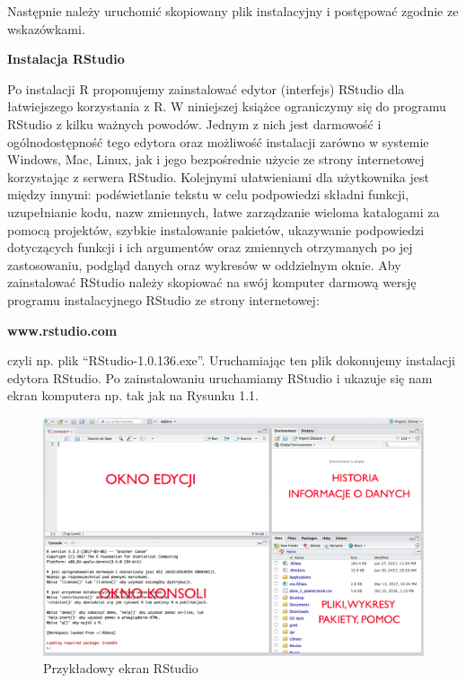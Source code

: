 \documentclass[12pt,B5paper,]{book}
\begin{document}
Następnie należy uruchomić skopiowany plik instalacyjny i postępować
zgodnie ze wskazówkami.

\textbf{Instalacja RStudio}

Po instalacji R proponujemy zainstalować edytor (interfejs) RStudio
\citep{RStudio} dla łatwiejszego korzystania z R. W niniejszej książce
ograniczymy się do programu RStudio z kilku ważnych powodów. Jednym z
nich jest darmowość i ogólnodostępność tego edytora oraz możliwość
instalacji zarówno w systemie Windows, Mac, Linux, jak i jego
bezpośrednie użycie ze strony internetowej korzystając z serwera
RStudio. Kolejnymi ułatwieniami dla użytkownika jest między innymi:
podświetlanie tekstu w celu podpowiedzi składni funkcji, uzupełnianie
kodu, nazw zmiennych, łatwe zarządzanie wieloma katalogami za pomocą
projektów, szybkie instalowanie pakietów, ukazywanie podpowiedzi
dotyczących funkcji i ich argumentów oraz zmiennych otrzymanych po jej
zastosowaniu, podgląd danych oraz wykresów w oddzielnym oknie. Aby
zainstalować RStudio należy skopiować na swój komputer darmową wersję
programu instalacyjnego RStudio ze strony internetowej:

\begin{center}
{\bf www.rstudio.com }
\end{center}

czyli np. plik ``RStudio-1.0.136.exe''. Uruchamiając ten plik dokonujemy
instalacji edytora RStudio. Po zainstalowaniu uruchamiamy RStudio i
ukazuje się nam ekran komputera np. tak jak na Rysunku 1.1.

\begin{figure}[H]

{\centering \includegraphics[width=0.99\linewidth]{images/RStudio} 

}

\caption{Przykładowy ekran RStudio}\label{fig:unnamed-chunk-2}
\end{figure}
\end{document}
